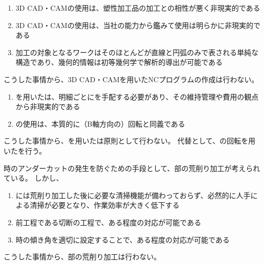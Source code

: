 \begin{enumerate}[label*=\alph*)]
\item {}3D CAD・CAMの使用は、塑性加工品の加工との相性が悪く非現実的である
\item {}3D CAD・CAMの使用は、当社の能力から鑑みて使用は明らかに非現実的である
\item 加工の対象となるワークはそのほとんどが直線と円弧のみで表される単純な構造であり、幾何的情報は初等幾何学で解析的導出が可能である
\end{enumerate}
こうした事情から、3D CAD・CAMを用いたNCプログラムの作成は行わない。



\clearpage
\begin{enumerate}[label*=\alph*)]
\item \Spacer を用いた\AlocationAdjustment は、明細ごとに\Spacer を手配する必要があり、その維持管理や費用の観点から非現実的である
\item \Spacer の使用は、本質的に（B軸方向の）回転と同義である
\end{enumerate}
こうした事情から、\Spacer を用いた\AlocationAdjustment は原則として行わない。
代替として、\Table の回転を用いた\AlocationAdjustment を行う。



\DimpleMilling 時のアンダーカットの発生を防ぐための手段として、\EndFace 部の荒削り加工が考えられている。
しかし、
\begin{enumerate}[label*=\alph*)]
\item \DMC には荒削り加工した後に必要な清掃機能が備わっておらず、必然的に人手による清掃が必要となり、作業効率が大きく低下する
\item 前工程である切断の工程で、ある程度の対応が可能である
\item \DimpleMilling 時の傾き角を適切に設定することで、ある程度の対応が可能である
\end{enumerate}
こうした事情から、\EndFace 部の荒削り加工は行わない。



